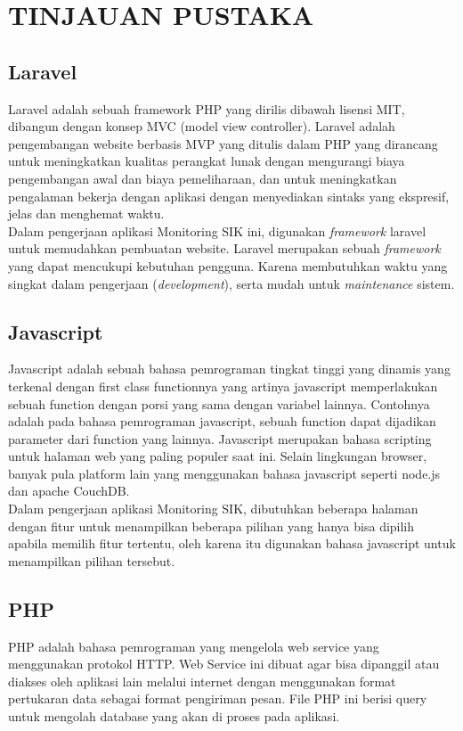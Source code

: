 \chapter{TINJAUAN PUSTAKA}

\section{Laravel}
\tab Laravel adalah sebuah framework PHP yang dirilis dibawah lisensi MIT, dibangun dengan konsep MVC (model view controller). Laravel adalah pengembangan website berbasis MVP yang ditulis dalam PHP yang dirancang untuk meningkatkan kualitas perangkat lunak dengan mengurangi biaya pengembangan awal dan biaya pemeliharaan, dan untuk meningkatkan pengalaman bekerja dengan aplikasi dengan menyediakan sintaks yang ekspresif, jelas dan menghemat waktu\cite{laravel}.\\
\tab Dalam pengerjaan aplikasi Monitoring SIK ini, digunakan \textit{framework} laravel untuk memudahkan pembuatan website. Laravel merupakan sebuah \textit{framework} yang dapat mencukupi kebutuhan pengguna. Karena membutuhkan waktu yang singkat dalam pengerjaan (\textit{development}), serta mudah untuk \textit{maintenance} sistem.

\section{Javascript}
\tab Javascript adalah sebuah bahasa pemrograman tingkat tinggi yang dinamis yang terkenal dengan first class functionnya yang artinya javascript memperlakukan sebuah function dengan porsi yang sama dengan variabel lainnya. Contohnya adalah pada bahasa pemrograman javascript, sebuah function dapat dijadikan parameter dari function yang lainnya. Javascript merupakan bahasa scripting untuk halaman web yang paling populer saat ini. Selain lingkungan browser, banyak pula platform lain yang menggunakan bahasa javascript seperti node.js dan apache CouchDB\cite{javascript}.\\
\tab Dalam pengerjaan aplikasi Monitoring SIK, dibutuhkan beberapa halaman dengan fitur untuk menampilkan beberapa pilihan yang hanya bisa dipilih apabila memilih fitur tertentu, oleh karena itu digunakan bahasa javascript untuk menampilkan pilihan tersebut.

\section{PHP}
\tab PHP adalah bahasa pemrograman yang mengelola web service yang menggunakan protokol HTTP. Web Service ini dibuat agar bisa dipanggil atau diakses oleh aplikasi lain melalui internet dengan menggunakan format pertukaran data sebagai format pengiriman pesan. File PHP ini berisi query untuk mengolah database yang akan di proses pada aplikasi\cite{PHP}.

